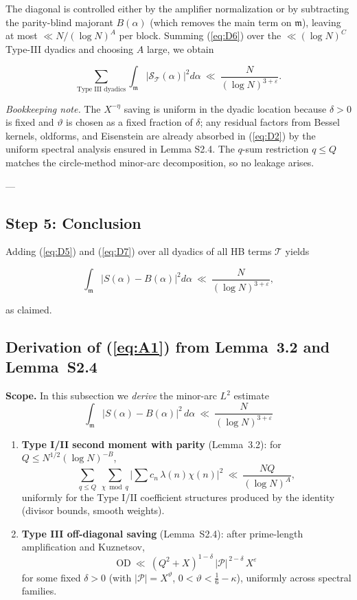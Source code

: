 \documentclass[11pt]{article}
\def\eqref#1{(\ref{#1})}%
\theoremstyle{definition}
\theoremstyle{remark}
\numberwithin{equation}{part}
\begin{document}
The diagonal is controlled either by the amplifier normalization or by subtracting the parity-blind majorant $B(\alpha)$ (which removes the main term on $\mathfrak m$), leaving at most $\ll N/(\log N)^A$ per block. Summing \eqref{eq:D6} over the $\ll(\log N)^C$ Type-III dyadics and choosing $A$ large, we obtain

\begin{equation}\label{eq:D7}\sum_{\text{Type III dyadics}}\int_{\mathfrak m}\big|\mathcal S_{\mathcal T}(\alpha)\big|^2 d\alpha\ \ll\ \frac{N}{(\log N)^{3+\varepsilon}}.\end{equation}

\emph{Bookkeeping note.} The $X^{-\eta}$ saving is uniform in the dyadic location because $\delta>0$ is fixed and $\vartheta$ is chosen as a fixed fraction of $\delta$; any residual factors from Bessel kernels, oldforms, and Eisenstein are already absorbed in \eqref{eq:D2} by the uniform spectral analysis ensured in Lemma S2.4. The $q$-sum restriction $q\le Q$ matches the circle-method minor-arc decomposition, so no leakage arises.

---

\subsection{Step 5: Conclusion}
Adding \eqref{eq:D5} and \eqref{eq:D7} over all dyadics of all HB terms $\mathcal T$ yields

$$
	\int_{\mathfrak m}\big|S(\alpha)-B(\alpha)\big|^2 d\alpha
	\ \ll\ \frac{N}{(\log N)^{3+\varepsilon}},
$$

as claimed.
\subsection{Derivation of \eqref{eq:A1} from Lemma~3.2 and Lemma~S2.4}

\noindent\textbf{Scope.} In this subsection we \emph{derive} the minor-arc $L^2$ estimate
\[\int_{\mathfrak m}|S(\alpha)-B(\alpha)|^2\,d\alpha\ \ll\ \frac{N}{(\log N)^{3+\varepsilon}}\]
\begin{enumerate}[label=(\roman*)]
	\item \textbf{Type I/II second moment with parity} (Lemma~3.2): for $Q\le N^{1/2}(\log N)^{-B}$,
	      \[
		      \sum_{q\le Q}\ \sum_{\chi\bmod q}\Big|\sum c_n\,\lambda(n)\chi(n)\Big|^2
		      \ \ll\ \frac{NQ}{(\log N)^A},
	      \]
	      uniformly for the Type I/II coefficient structures produced by the identity (divisor bounds, smooth weights).

	\item \textbf{Type III off-diagonal saving} (Lemma~S2.4): after prime-length amplification and Kuznetsov,
	      \[
		      \mathrm{OD}\ \ll\ (Q^2+X)^{1-\delta}\,|\mathcal P|^{\,2-\delta}\,X^{\varepsilon}
	      \]
	      for some fixed $\delta>0$ (with $|\mathcal P|=X^\vartheta$, $0<\vartheta<\tfrac16-\kappa$), uniformly across spectral families.
\end{enumerate}
\end{document}

